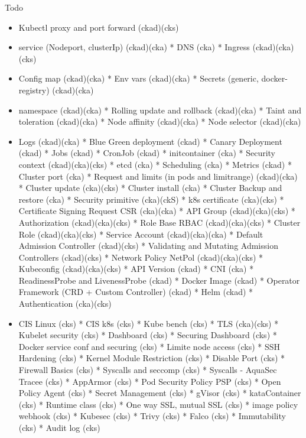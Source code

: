 \begin{frame}[fragile]{Todo}
\begin{itemize}
\item[todo] Kubectl proxy and port forward (ckad)(cks)
\item[app access] service (Nodeport, clusterIp) (ckad)(cka)
* DNS (cka)
* Ingress (ckad)(cka)(cks)
\item[config] Config map (ckad)(cka)
* Env vars (ckad)(cka)
* Secrets (generic, docker-registry) (ckad)(cka)
\item[scheduling] namespace (ckad)(cka)
* Rolling update and rollback (ckad)(cka)
* Taint and toleration (ckad)(cka)
* Node affinity (ckad)(cka)
* Node selector (ckad)(cka)
\item[vrac] Logs (ckad)(cka)
* Blue Green deployment (ckad)
* Canary Deployment (ckad)
* Jobs (ckad)
* CronJob (ckad)
* initcontainer (cka)
* Security context (ckad)(cka)(cks)
* etcd (cka)
* Scheduling (cka)
* Metrics (ckad)
* Cluster port (cka)
* Request and limits (in pods and limitrange) (ckad)(cka)
* Cluster update (cka)(cks)
* Cluster install (cka)
* Cluster Backup and restore (cka)
* Security primitive (cka)(ckS)
* k8s certificate (cka)(cks)
* Certificate Signing Request CSR (cka)(cka)
* API Group (ckad)(cka)(cks)
* Authorization (ckad)(cka)(cks)
* Role Base RBAC (ckad)(cka)(cks)
* Cluster Role (ckad)(cka)(cks)
* Service Account (ckad)(cka)(cka)
* Default Admission Controller (ckad)(cks)
* Validating and Mutating Admission Controllers (ckad)(cks)
* Network Policy NetPol (ckad)(cka)(cks)
* Kubeconfig (ckad)(cka)(cks)
* API Version (ckad)
* CNI (cka)
* ReadinessProbe and LivenessProbe (ckad)
* Docker Image (ckad)
* Operator Framework (CRD + Custom Controller) (ckad)
* Helm (ckad)
* Authentication (cka)(cks)
\item[security] CIS Linux (cks)
* CIS k8s (cks)
* Kube bench (cks)
* TLS (cka)(cks)
* Kubelet security (cks)
* Dashboard (cks)
* Securing Dashboard (cks)
* Docker service conf and securing (cks)
* Limite node access (cks)
* SSH Hardening (cks)
* Kernel Module Restriction (cks)
* Disable Port (cks)
* Firewall Basics (cks)
* Syscalls and seccomp (cks)
* Syscalls - AquaSec Tracee (cks)
* AppArmor (cks)
* Pod Security Policy PSP (cks)
* Open Policy Agent (cks)
* Secret Management (cks)
* gVisor (cks)
* kataContainer (cks)
* Runtime class (cks)
* One way SSL, mutual SSL (cks)
* image policy webhook (cks)
* Kubesec (cks)
* Trivy (cks)
* Falco (cks)
* Immutability (cks)
* Audit log (cks)
\end{itemize}
\end{frame}
